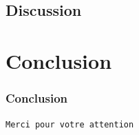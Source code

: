 \documentclass[11pt]{beamer}
\begin{document}
 \subsection{Discussion} 
 
 \section*{Conclusion}
 \begin{frame}
 \frametitle{Conclusion}
 \end{frame}
 
 \begin{frame}
 	\begin{center}
 		\LARGE{\texttt{Merci pour votre attention}}
 	\end{center}
 \end{frame}
 
% 
 
 
\end{document}
